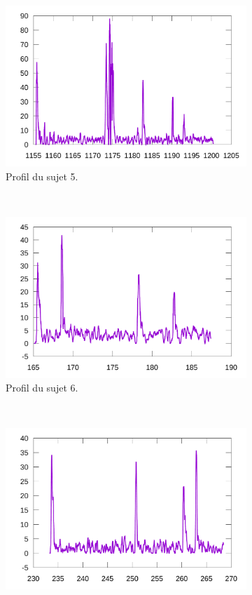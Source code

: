 	\begin{figure}[!htb]
		\centering
		\begin{subfigure}[t]{\subImgWlineplot}
			\centering
			\includegraphics[width=\textwidth]{figures/ch4/subject_05_60_8_219_smoothed}
			\caption{Profil du sujet 5.}
			\label{fig:hardProfile5}
		\end{subfigure}
		~
		\begin{subfigure}[t]{\subImgWlineplot}
			\centering
			\includegraphics[width=\textwidth]{figures/ch4/subject_06_60_13_219_smoothed}
			\caption{Profil du sujet 6.}
			\label{fig:hardProfile6}
		\end{subfigure}
		~
		\begin{subfigure}[t]{\subImgWlineplot}
			\centering
			\includegraphics[width=\textwidth]{figures/ch4/subject_08_180_8_219_smoothed}

\end{subfigure}
\end{figure}
